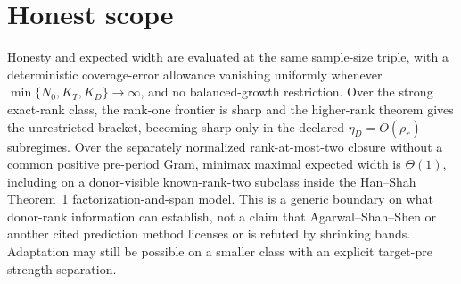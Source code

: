 \documentclass{article}
\begin{document}
\section{Honest scope}

Honesty and expected width are evaluated at the same sample-size triple, with a deterministic coverage-error allowance vanishing uniformly whenever \(\min\{N_0,K_T,K_D\}\to\infty\), and no balanced-growth restriction. Over the strong exact-rank class, the rank-one frontier is sharp and the higher-rank theorem gives the unrestricted bracket, becoming sharp only in the declared \(\eta_D=O(\rho_r)\) subregimes. Over the separately normalized rank-at-most-two closure without a common positive pre-period Gram, minimax maximal expected width is \(\Theta(1)\), including on a donor-visible known-rank-two subclass inside the Han--Shah Theorem~1 factorization-and-span model. This is a generic boundary on what donor-rank information can establish, not a claim that Agarwal--Shah--Shen or another cited prediction method licenses or is refuted by shrinking bands. Adaptation may still be possible on a smaller class with an explicit target-pre strength separation.
\end{document}
